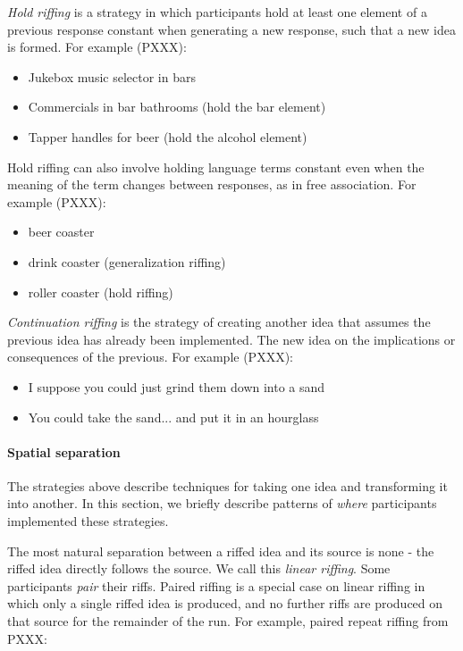 \emph{Hold riffing} is a strategy in which participants hold at least one element of a previous response constant when generating a new response, such that a new idea is formed. For example (PXXX):

\begin{itemize}
    \item Jukebox music selector in bars
    \item Commercials in bar bathrooms (hold the bar element)
    \item Tapper handles for beer (hold the alcohol element)
\end{itemize}

Hold riffing can also involve holding language terms constant even when the meaning of the term changes between responses, as in free association. For example (PXXX):

\begin{itemize}
    \item beer coaster
    \item drink coaster (generalization riffing)
    \item roller coaster (hold riffing)
\end{itemize}

\emph{Continuation riffing} is the strategy of creating another idea that assumes the previous idea has already been implemented. The new idea on the implications or consequences of the previous. For example (PXXX):

\begin{itemize}
    \item I suppose you could just grind them down into a sand
    \item You could take the sand... and put it in an hourglass
\end{itemize}

\paragraph{Spatial separation}

The strategies above describe techniques for taking one idea and transforming it into another. In this section, we briefly describe patterns of \emph{where} participants implemented these strategies.

The most natural separation between a riffed idea and its source is none - the riffed idea directly follows the source. We call this \emph{linear riffing}. Some participants \emph{pair} their riffs. Paired riffing is a special case on linear riffing in which only a single riffed idea is produced, and no further riffs are produced on that source for the remainder of the run. For example, paired repeat riffing from PXXX:

